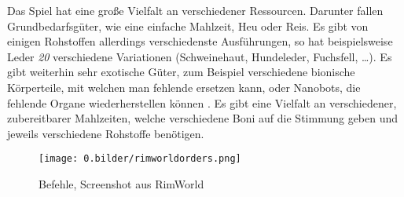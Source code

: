Das Spiel hat eine große Vielfalt an verschiedener Ressourcen. Darunter fallen Grundbedarfsgüter, wie eine einfache Mahlzeit, Heu oder Reis. Es gibt von einigen Rohstoffen allerdings verschiedenste Ausführungen, so hat beispielsweise Leder \textit{20} verschiedene Variationen (Schweinehaut, Hundeleder, Fuchsfell, \dots). Es gibt weiterhin sehr exotische Güter, zum Beispiel verschiedene bionische Körperteile, mit welchen man fehlende ersetzen kann, oder Nanobots, die fehlende Organe wiederherstellen können \cite*[]{rimworld:resources}. Es gibt eine Vielfalt an verschiedener, zubereitbarer Mahlzeiten, welche verschiedene Boni auf die Stimmung geben und jeweils verschiedene Rohstoffe benötigen.


\begin{figure}
    \begin{center}
        \texttt{[image: 0.bilder/rimworldorders.png]}
    \end{center}
    \caption{Befehle, Screenshot aus RimWorld} \label{image:rimworldorders}
\end{figure}